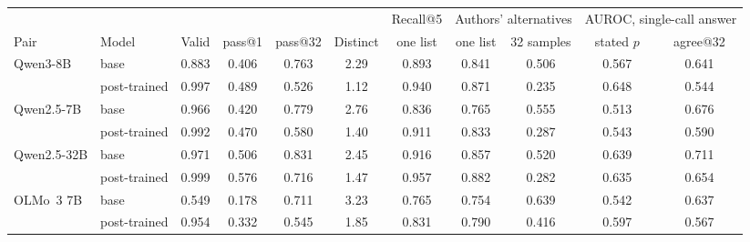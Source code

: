 \documentclass[wcp]{jmlr}
\begin{document}
\begin{table}[t]
\centering\small
\begin{adjustbox}{max width=\linewidth}
\begin{tabular}{llccccccccc}
\toprule
 & & & & & & Recall@5 & \multicolumn{2}{c}{Authors' alternatives} & \multicolumn{2}{c}{AUROC, single-call answer} \\
Pair & Model & Valid & pass@1 & pass@32 & Distinct & one list & one list & 32 samples & stated $p$ & agree@32 \\
\midrule
Qwen3-8B & base & 0.883 & 0.406 & 0.763 & 2.29 & 0.893 & 0.841 & 0.506 & 0.567 & 0.641 \\
 & post-trained & 0.997 & 0.489 & 0.526 & 1.12 & 0.940 & 0.871 & 0.235 & 0.648 & 0.544 \\
Qwen2.5-7B & base & 0.966 & 0.420 & 0.779 & 2.76 & 0.836 & 0.765 & 0.555 & 0.513 & 0.676 \\
 & post-trained & 0.992 & 0.470 & 0.580 & 1.40 & 0.911 & 0.833 & 0.287 & 0.543 & 0.590 \\
Qwen2.5-32B & base & 0.971 & 0.506 & 0.831 & 2.45 & 0.916 & 0.857 & 0.520 & 0.639 & 0.711 \\
 & post-trained & 0.999 & 0.576 & 0.716 & 1.47 & 0.957 & 0.882 & 0.282 & 0.635 & 0.654 \\
OLMo~3 7B & base & 0.549 & 0.178 & 0.711 & 3.23 & 0.765 & 0.754 & 0.639 & 0.542 & 0.637 \\
 & post-trained & 0.954 & 0.332 & 0.545 & 1.85 & 0.831 & 0.790 & 0.416 & 0.597 & 0.567 \\
\bottomrule
\end{tabular}
\end{adjustbox}


\end{table}
\end{document}
